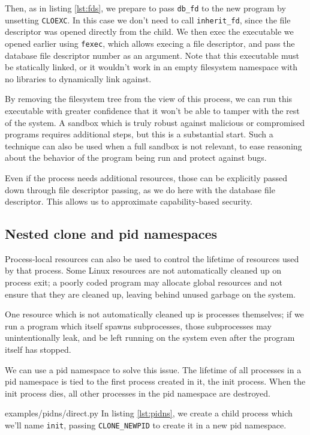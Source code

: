 \documentclass[letterpaper,twocolumn,10pt]{article}
\begin{document}
Then, as in listing \ref{lst:fds}, we prepare to pass \texttt{db\_fd} to the new program by unsetting \texttt{CLOEXC}.
In this case we don't need to call \verb|inherit_fd|,
since the file descriptor was opened directly from the child.
We then exec the executable we opened earlier using \texttt{fexec},
which allows execing a file descriptor,
and pass the database file descriptor number as an argument.\cite{execveat}
Note that this executable must be statically linked,
or it wouldn't work in an empty filesystem namespace
with no libraries to dynamically link against.

By removing the filesystem tree from the view of this process,
we can run this executable with greater confidence
that it won't be able to tamper with the rest of the system.
A sandbox which is truly robust against malicious or compromised programs requires additional steps,
but this is a substantial start.\cite{firejail}\cite{gvisor}
Such a technique can also be used when a full sandbox is not relevant,
to ease reasoning about the behavior of the program being run
and protect against bugs.

Even if the process needs additional resources,
those can be explicitly passed down through file descriptor passing,
as we do here with the database file descriptor.
This allows us to approximate capability-based security.\cite{capsicum}
\subsection{Nested clone and pid namespaces}\label{pidns}
Process-local resources can also be used to control the lifetime of resources used by that process.
Some Linux resources are not automatically cleaned up on process exit;
a poorly coded program may allocate global resources
and not ensure that they are cleaned up,
leaving behind unused garbage on the system.

One resource which is not automatically cleaned up is processes themselves;
if we run a program which itself spawns subprocesses,
those subprocesses may unintentionally leak,
and be left running on the system even after the program itself has stopped.\cite{caternfork}

We can use a pid namespace to solve this issue.
The lifetime of all processes in a pid namespace is tied to the first process created in it,
the init process.
When the init process dies,
all other processes in the pid namespace are destroyed.\cite{pid_namespaces}


{examples/pidns/direct.py}
In listing \ref{lst:pidns},
we create a child process which we'll name \texttt{init},
passing \verb|CLONE_NEWPID| to create it in a new pid namespace.\cite{clone}
\end{document}
